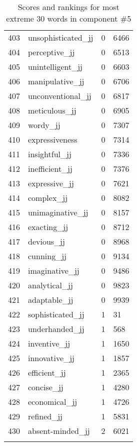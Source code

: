 \begin{longtable}[!htbp]{| rlr@{.}l |}
    403 & unsophisticated\_jj & 0 & 6466 \\
    404 & perceptive\_jj & 0 & 6513 \\
    405 & unintelligent\_jj & 0 & 6603 \\
    406 & manipulative\_jj & 0 & 6706 \\
    407 & unconventional\_jj & 0 & 6817 \\
    408 & meticulous\_jj & 0 & 6905 \\
    409 & wordy\_jj & 0 & 7307 \\
    410 & expressiveness & 0 & 7314 \\
    411 & insightful\_jj & 0 & 7336 \\
    412 & inefficient\_jj & 0 & 7376 \\
    413 & expressive\_jj & 0 & 7621 \\
    414 & complex\_jj & 0 & 8082 \\
    415 & unimaginative\_jj & 0 & 8157 \\
    416 & exacting\_jj & 0 & 8712 \\
    417 & devious\_jj & 0 & 8968 \\
    418 & cunning\_jj & 0 & 9134 \\
    419 & imaginative\_jj & 0 & 9486 \\
    420 & analytical\_jj & 0 & 9823 \\
    421 & adaptable\_jj & 0 & 9939 \\
    422 & sophisticated\_jj & 1 & 31 \\
    423 & underhanded\_jj & 1 & 568 \\
    424 & inventive\_jj & 1 & 1650 \\
    425 & innovative\_jj & 1 & 1857 \\
    426 & efficient\_jj & 1 & 2365 \\
    427 & concise\_jj & 1 & 4280 \\
    428 & economical\_jj & 1 & 4726 \\
    429 & refined\_jj & 1 & 5831 \\
    430 & absent-minded\_jj & 2 & 6021 \\
    \hline
    \caption{Scores and rankings for most extreme 30 words in component \#5} \\
\end{longtable}
